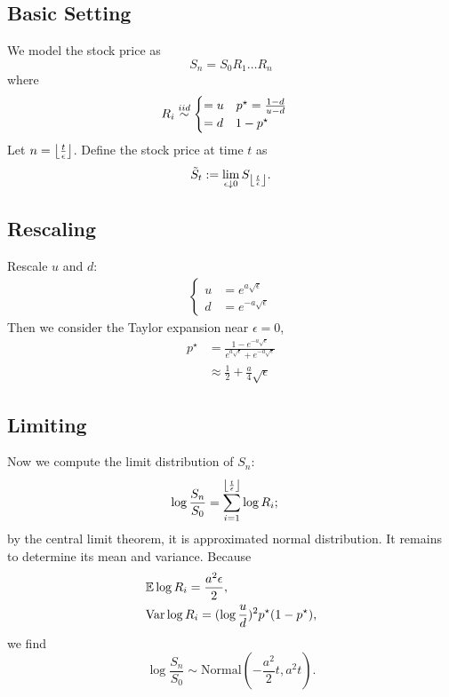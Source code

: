 \subsection*{Basic Setting}
We model the stock price as 
$$S_n = S_0 R_1 \dots R_n$$
where 
$$R_i \stackrel{iid}{\sim} \begin{cases}
=u \quad p^\star = \frac{1-d}{u-d} \\
=d \quad 1-p^\star
\end{cases}$$ 
Let $n = \left\lfloor \frac{t}{\epsilon} \right\rfloor$. Define the stock price at time $t$ as 
$$\tilde{S}_t := \lim\limits_{ \epsilon \downarrow 0 } S_{\left\lfloor \frac{t}{\epsilon} \right\rfloor}.$$

\subsection*{Rescaling}
Rescale $u$ and $d$:
\begin{align*}
	\begin{cases}
	u &= e^{ a\sqrt{\epsilon} } \\
	d &= e^{ -a\sqrt{\epsilon} }
	\end{cases}
\end{align*}
Then we consider the Taylor expansion near $\epsilon = 0$,
\begin{align*}
	p^\star &= \frac{ 1 - e^{ -a\sqrt{\epsilon} }  }{ e^{ a\sqrt{\epsilon} } +  e^{ -a\sqrt{\epsilon} }} \\
	&\approx \frac{1}{2} + \frac{a}{4}\sqrt{\epsilon}
\end{align*}

\subsection*{Limiting}
Now we compute the limit distribution of $S_n$:
\begin{align*}
	\log \frac{S_n}{S_0} &= \sum^{\left\lfloor \frac{t}{\epsilon} \right\rfloor}_{i=1} \log R_i ;
\end{align*}
by the central limit theorem, it is approximated normal distribution. It remains to determine its mean and variance. Because
\begin{align*}
	&\mathbb{E} \log R_i = \frac{a^2 \epsilon}{2}, \\
	&\mathrm{Var} \log R_i = ( \log \frac{u}{d} )^2 p^\star (1 - p^\star),
\end{align*}
we find 
$$\log \frac{S_n}{S_0} \sim \mathrm{Normal}(  -\frac{a^2}{2}t, a^2 t ).$$